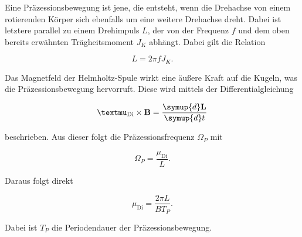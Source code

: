 Eine Präzessionsbewegung ist jene, die entsteht, wenn die Drehachse von einem rotierenden Körper sich ebenfalls um eine weitere Drehachse dreht. 
Dabei ist letztere parallel zu einem Drehimpuls $L$, der von der Frequenz $f$ und dem oben bereits erwähnten Trägheitsmoment $J_K$ abhängt. Dabei gilt die Relation

\begin{equation}
    \label{eqn:drehimpuls}
    L = 2 \pi f J_K.
\end{equation}

Das Magnetfeld der Helmholtz-Spule wirkt eine äußere Kraft auf die Kugeln, was die Präzessionsbewegung hervorruft. Diese wird mittels der Differentialgleichung

\begin{equation}
    \mathbf{µ}_\text{Di} \times \mathbf{B} = \frac{\symup{d}\mathbf{L}}{\symup{d}t}
\end{equation}

beschrieben. Aus dieser folgt die Präzessionsfrequenz $\Omega_P$ mit

\begin{equation}
    \label{eqn:praez-freq}
    \Omega_P = \frac{\mu_\text{Di}}{L}.
\end{equation}

Daraus folgt direkt

\begin{equation}
    \label{eqn:magn-praez}
    \mu_\text{Di} = \frac{2 \pi L}{B T_P}.
\end{equation}

Dabei ist $T_P$ die Periodendauer der Präzessionsbewegung.